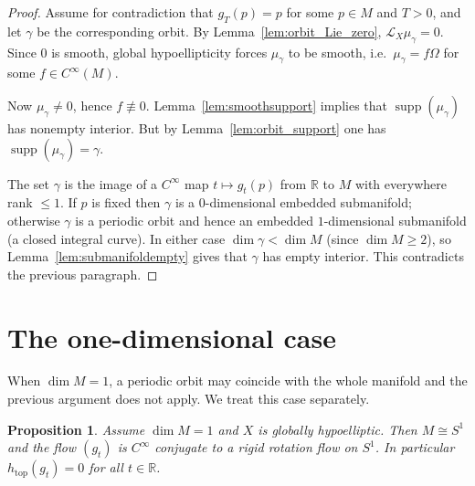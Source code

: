 \documentclass[11pt]{article}
\newtheorem{proposition}[theorem]{Proposition}
\theoremstyle{definition}
\theoremstyle{remark}
\newcommand{\Lie}{\mathcal{L}}
\newcommand{\R}{\mathbb{R}}
\newcommand{\supp}{\operatorname{supp}}
\newcommand{\htop}{h_{\mathrm{top}}}
\begin{document}
\begin{proof}
Assume for contradiction that $g_T(p)=p$ for some $p\in M$ and $T>0$, and let $\gamma$ be the corresponding orbit.
By Lemma~\ref{lem:orbit_Lie_zero}, $\Lie_X\mu_\gamma=0$.
Since $0$ is smooth, global hypoellipticity forces $\mu_\gamma$ to be smooth, i.e.\ $\mu_\gamma=f\Omega$ for some $f\in C^\infty(M)$.

Now $\mu_\gamma\neq 0$, hence $f\not\equiv 0$.
Lemma~\ref{lem:smoothsupport} implies that $\supp(\mu_\gamma)$ has nonempty interior.
But by Lemma~\ref{lem:orbit_support} one has $\supp(\mu_\gamma)=\gamma$.

The set $\gamma$ is the image of a $C^\infty$ map $t\mapsto g_t(p)$ from $\R$ to $M$ with everywhere rank $\le 1$.
If $p$ is fixed then $\gamma$ is a $0$-dimensional embedded submanifold; otherwise $\gamma$ is a periodic orbit and hence an embedded $1$-dimensional submanifold (a closed integral curve).
In either case $\dim\gamma<\dim M$ (since $\dim M\ge 2$), so Lemma~\ref{lem:submanifoldempty} gives that $\gamma$ has empty interior.
This contradicts the previous paragraph.
\end{proof}

\section{The one-dimensional case}

When $\dim M=1$, a periodic orbit may coincide with the whole manifold and the previous argument does not apply.
We treat this case separately.

\begin{proposition}\label{prop:dim1}
Assume $\dim M=1$ and $X$ is globally hypoelliptic.
Then $M\cong S^1$ and the flow $(g_t)$ is $C^\infty$ conjugate to a rigid rotation flow on $S^1$.
In particular $\htop(g_t)=0$ for all $t\in\R$.
\end{proposition}
\end{document}
